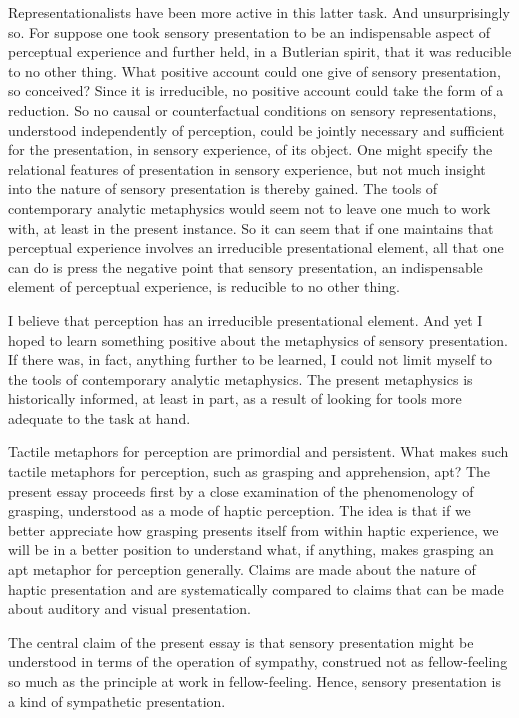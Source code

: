 \documentclass[12pt]{article}
\begin{document}
Representationalists have been more active in this latter task. And unsurprisingly so. For suppose one took sensory presentation to be an indispensable aspect of perceptual experience and further held, in a Butlerian spirit, that it was reducible to no other thing. What positive account could one give of sensory presentation, so conceived? Since it is irreducible, no positive account could take the form of a reduction. So no causal or counterfactual conditions on sensory representations, understood independently of perception, could be jointly necessary and sufficient for the presentation, in sensory experience, of its object. One might specify the
relational features of presentation in sensory experience, but not much insight into the nature of sensory presentation is thereby gained. The tools of contemporary analytic metaphysics would seem not to leave one much to work with, at least in the present instance. So it can seem that if one maintains that perceptual experience involves an irreducible presentational element, all that one can do is press the negative point that sensory presentation, an indispensable element of perceptual experience, is reducible to no other thing.

I believe that perception has an irreducible presentational element. And yet I hoped to learn something positive about the metaphysics of sensory presentation. If there was, in fact, anything further to be learned, I could not limit myself to the tools of contemporary analytic metaphysics. The present metaphysics is historically informed, at least in part, as a result of looking for tools more adequate to the task at hand. 

Tactile metaphors for perception are primordial and persistent. What makes such tactile metaphors for perception, such as grasping and apprehension, apt? The present essay proceeds first by a close examination of the phenomenology of grasping, understood as a mode of haptic perception. The idea is that if we better appreciate how grasping presents itself from within haptic experience, we will be in a better position to understand what, if anything, makes grasping an apt metaphor for perception generally. Claims are made about the nature of haptic presentation and are systematically compared to claims that can be made about auditory and visual presentation.

The central claim of the present essay is that sensory presentation might be understood in terms of the operation of sympathy, construed not as fellow-feeling so much as the principle at work in fellow-feeling. Hence, sensory presentation is a kind of sympathetic presentation.
\end{document}
